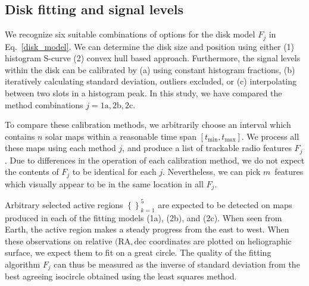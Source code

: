 \documentclass{aa}
\newcommand{\s}[2]{{#1}_{\mathrm{#2}}}
\begin{document}
\subsection{Disk fitting and signal levels} \label{Sect:DiskFitting}

We recognize six suitable combinations of options for the disk model $F_j$ in 
Eq.~\ref{disk_model}. 
We can 
determine the disk size and position using either (1) histogram S-curve (2) convex hull based approach. Furthermore, the 
signal levels within the disk can be calibrated by (a) using constant histogram fractions, (b) iteratively calculating 
standard deviation, outliers excluded, or (c) interpolating between two slots in a histogram peak. In this study, we have compared the method 
combinations $j = \mathrm{1a}, \mathrm{2b}, \mathrm{2c}$.

To compare these calibration methods, we arbitrarily choose an interval which contains $n$ solar maps within a 
reasonable time span $[\s{t}{min},\s{t}{max}]$. We process all these maps using each method $j$, and produce a list of 
trackable radio features $F_j$. Due to differences in the operation of each calibration method, we do not expect the 
contents of $F_j$ to be identical for each $j$. Nevertheless, we can pick $m$ features which visually appear to be in 
the same location in all $F_j$.

Arbitrary selected active regions $\left\{ \right\}_{k=1}^{5}$ are expected to be detected on maps produced in each of 
the fitting models (1a), (2b), and (2c). When seen from Earth, the active region makes a steady progress from 
the east 
to west. When these observations on relative $(\mathrm{RA}, \mathrm{dec}$ coordinates are plotted on heliographic 
surface, we expect them to fit on a great
circle. The quality of the fitting algorithm $F_j$ can thus be measured as the 
inverse of standard deviation from the best agreeing isocircle obtained using the 
least squares method.
\end{document}
